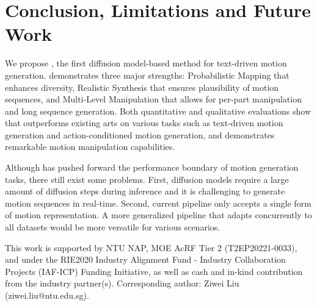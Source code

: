 \section{Conclusion, Limitations and Future Work}\label{sec5}
We propose \name, the first diffusion model-based method for text-driven motion generation. \name demonstrates three major strengths: Probabilistic Mapping that enhances diversity, Realistic Synthesis that ensures plausibility of motion sequences, and Multi-Level Manipulation that allows for per-part manipulation and long sequence generation. Both quantitative and qualitative evaluations show that \name outperforms existing arts on various tasks such as text-driven motion generation and action-conditioned motion generation, and demonstrates remarkable motion manipulation capabilities.

Although \name has pushed forward the performance boundary of motion generation tasks, there still exist some problems. First, diffusion models require a large amount of diffusion steps during inference and it is challenging to generate motion sequences in real-time. Second, current pipeline only accepts a single form of motion representation. A more generalized pipeline that adapts concurrently to all datasets would be more versatile for various scenarios.

\begin{acknowledgements}
This work is supported by NTU NAP, MOE AcRF Tier 2
(T2EP20221-0033), and under the RIE2020 Industry Alignment Fund - Industry Collaboration Projects (IAF-ICP) Funding Initiative, as well as cash and in-kind contribution from the industry partner(s).
Corresponding author: Ziwei Liu (ziwei.liu@ntu.edu.sg).
\end{acknowledgements}





         




